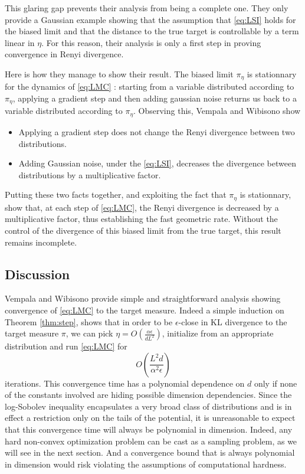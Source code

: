 \documentclass[10pt,journal,a4paper]{IEEEtran}
\theoremstyle{definition}
\begin{document}
This glaring gap prevents their analysis from being a complete one. They only provide a Gaussian example showing that the assumption that \eqref{eq:LSI} holds for the biased limit and that the distance to the true target is controllable by a term linear in $\eta$. For this reason, their analysis is only a first step in proving convergence in Renyi divergence.

Here is how they manage to show their result. The biased limit $\pi_\eta$ is stationnary for the dynamics of \eqref{eq:LMC} : starting from a variable distributed according to $\pi_\eta$, applying a gradient step and then adding gaussian noise returns us back to a variable distributed according to $\pi_\eta$. Observing this, Vempala and Wibisono show
\begin{itemize}
\item Applying a gradient step does not change the Renyi divergence between two distributions.
\item Adding Gaussian noise, under the \eqref{eq:LSI}, decreases the divergence between distributions by a multiplicative factor.
\end{itemize}

Putting these two facts together, and exploiting the fact that $\pi_\eta$ is stationnary, \cite{vempala_rapid_2019} show that, at each step of \eqref{eq:LMC}, the Renyi divergence is decreased by a multiplicative factor, thus establishing the fast geometric rate. Without the control of the divergence of this biased limit from the true target, this result remains incomplete.

\subsection{Discussion}

Vempala and Wibisono provide simple and straightforward analysis showing convergence of \eqref{eq:LMC} to the target measure. Indeed a simple induction on Theorem \ref{thm:step}, shows that in order to be $\epsilon$-close in KL divergence to the target measure $\pi$, we can pick $\eta = O(\frac{\alpha \epsilon}{dL^2})$, initialize from an appropriate distribution and run \eqref{eq:LMC} for 
\[
O\left(\frac{L^2d}{\alpha^2\epsilon}\right)
\]
iterations. This convergence time has a polynomial dependence on $d$ only if none of the constants involved are hiding possible dimension dependencies. Since the log-Sobolev inequality encapsulates a very broad class of distributions and is in effect a restriction only on the tails of the potential, it is unreasonable to expect that this convergence time will always be polynomial in dimension. Indeed, any hard non-convex optimization problem can be cast as a sampling problem, as we will see in the next section. And a convergence bound that is always polynomial in dimension  would risk violating the assumptions of computational hardness.
\end{document}
